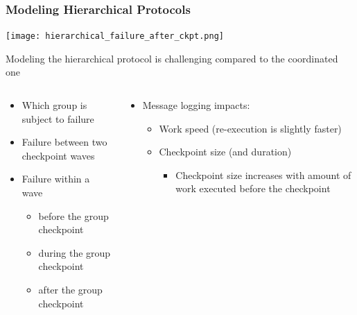 \begin{frame}
  \frametitle{Modeling Hierarchical Protocols}

  \begin{center}
    \texttt{[image: hierarchical\_failure\_after\_ckpt.png]}
  \end{center}

  Modeling the hierarchical protocol is challenging compared to the coordinated one
  
  \begin{columns}
    \begin{column}{.49\textwidth}
      \begin{itemize}
      \item Which group is subject to failure
      \item Failure between two checkpoint waves
      \item Failure within a wave
        \begin{itemize}
        \item before the group checkpoint
        \item during the group checkpoint
        \item after the group checkpoint
        \end{itemize}
      \end{itemize}
    \end{column}\begin{column}{.49\textwidth}
      \begin{itemize}
      \item Message logging impacts:
        \begin{itemize}
        \item Work speed (re-execution is slightly faster)
        \item Checkpoint size (and duration)
          \begin{itemize}
          \item Checkpoint size increases with amount of work executed before the checkpoint
          \end{itemize}
        \end{itemize}
      \end{itemize}
    \end{column}
  \end{columns}
  
\end{frame}

